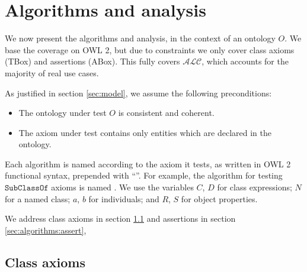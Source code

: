 \documentclass[paper.tex]{subfiles}
\begin{document}
\section{Algorithms and analysis}
\label{sec:algorithms}

We now present the algorithms and analysis, in the context of an ontology $O$.  We base the coverage on OWL 2, but due to constraints we only cover class axioms (TBox) and assertions (ABox).  This fully covers $\mathcal{ALC}$, which accounts for the majority of real use cases.

As justified in section \ref{sec:model}, we assume the following preconditions:
\begin{itemize}[nosep]
  \item The ontology under test $O$ is consistent and coherent.
  \item The axiom under test contains only entities which are declared in the ontology.
\end{itemize}

Each algorithm is named according to the axiom it tests, as written in OWL 2 functional syntax, prepended with ``''.  For example, the algorithm for testing $\mathtt{SubClassOf}$ axioms is named .  We use the variables $C$, $D$ for class expressions; $N$ for a named class; $a$, $b$ for individuals; and $R$, $S$ for object properties.

We address class axioms in section \ref{sec:algorithms:class} and assertions in section \ref{sec:algorithms:assert},

\subsection{Class axioms}
\label{sec:algorithms:class}

\end{document}
